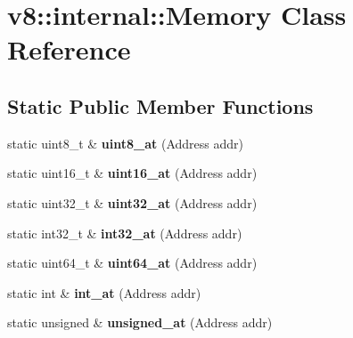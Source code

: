 \hypertarget{classv8_1_1internal_1_1_memory}{}\section{v8\+:\+:internal\+:\+:Memory Class Reference}
\label{classv8_1_1internal_1_1_memory}
\subsection*{Static Public Member Functions}
\begin{DoxyCompactItemize}
\item 
\hypertarget{classv8_1_1internal_1_1_memory_a22140801e40726e0a1765beb9c1b3718}{}static uint8\+\_\+t \& {\bfseries uint8\+\_\+at} (Address addr)\label{classv8_1_1internal_1_1_memory_a22140801e40726e0a1765beb9c1b3718}

\item 
\hypertarget{classv8_1_1internal_1_1_memory_a9a476e9ae1f102bec01a053fac6adce0}{}static uint16\+\_\+t \& {\bfseries uint16\+\_\+at} (Address addr)\label{classv8_1_1internal_1_1_memory_a9a476e9ae1f102bec01a053fac6adce0}

\item 
\hypertarget{classv8_1_1internal_1_1_memory_a38f6cdc22aa4642e967eb16d58452343}{}static uint32\+\_\+t \& {\bfseries uint32\+\_\+at} (Address addr)\label{classv8_1_1internal_1_1_memory_a38f6cdc22aa4642e967eb16d58452343}

\item 
\hypertarget{classv8_1_1internal_1_1_memory_afdb183a08970e652c8186765e89eef06}{}static int32\+\_\+t \& {\bfseries int32\+\_\+at} (Address addr)\label{classv8_1_1internal_1_1_memory_afdb183a08970e652c8186765e89eef06}

\item 
\hypertarget{classv8_1_1internal_1_1_memory_ada77135f011a8dc0d680ea42929c9789}{}static uint64\+\_\+t \& {\bfseries uint64\+\_\+at} (Address addr)\label{classv8_1_1internal_1_1_memory_ada77135f011a8dc0d680ea42929c9789}

\item 
\hypertarget{classv8_1_1internal_1_1_memory_a35048f8d72f2fbac05c35365600213a4}{}static int \& {\bfseries int\+\_\+at} (Address addr)\label{classv8_1_1internal_1_1_memory_a35048f8d72f2fbac05c35365600213a4}

\item 
\hypertarget{classv8_1_1internal_1_1_memory_afc89afc8594f502862a1714da4775b62}{}static unsigned \& {\bfseries unsigned\+\_\+at} (Address addr)\label{classv8_1_1internal_1_1_memory_afc89afc8594f502862a1714da4775b62}


\end{DoxyCompactItemize}
